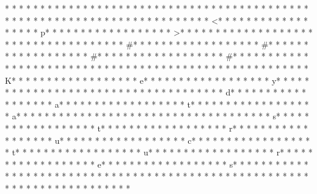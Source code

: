 * * *  * * *  * * *  *  * * *  *  * * *  * 	* * *  * * *  * * *  *  * * *  *  * * *  * 
* * *  * * *  * * *  *  * * *  *  * * *  * 	* * *  * * *  * * *  *  * * *  *  * * *  * <* * *  * * *  * * *  *  * * *  *  * * *  * p* * *  * * *  * * *  *  * * *  *  * * *  * >* * *  * * *  * * *  *  * * *  *  * * *  * 
* * *  * * *  * * *  *  * * *  *  * * *  * #* * *  * * *  * * *  *  * * *  *  * * *  * #* * *  * * *  * * *  *  * * *  *  * * *  * #* * *  * * *  * * *  *  * * *  *  * * *  * #* * *  * * *  * * *  *  * * *  *  * * *  *  * * *  * * *  * * *  *  * * *  *  * * *  * {* * *  * * *  * * *  *  * * *  *  * * *  * K* * *  * * *  * * *  *  * * *  *  * * *  * e* * *  * * *  * * *  *  * * *  *  * * *  * y* * *  * * *  * * *  *  * * *  *  * * *  *  * * *  * * *  * * *  *  * * *  *  * * *  * d* * *  * * *  * * *  *  * * *  *  * * *  * a* * *  * * *  * * *  *  * * *  *  * * *  * t* * *  * * *  * * *  *  * * *  *  * * *  * a* * *  * * *  * * *  *  * * *  *  * * *  *  * * *  * * *  * * *  *  * * *  *  * * *  * s* * *  * * *  * * *  *  * * *  *  * * *  * t* * *  * * *  * * *  *  * * *  *  * * *  * r* * *  * * *  * * *  *  * * *  *  * * *  * u* * *  * * *  * * *  *  * * *  *  * * *  * c* * *  * * *  * * *  *  * * *  *  * * *  * t* * *  * * *  * * *  *  * * *  *  * * *  * u* * *  * * *  * * *  *  * * *  *  * * *  * r* * *  * * *  * * *  *  * * *  *  * * *  * e* * *  * * *  * * *  *  * * *  *  * * *  * s* * *  * * *  * * *  *  * * *  *  * * *  * }* * *  * * *  * * *  *  * * *  *  * * *  * 
* * *  * * *  * * *  *  * * *  *  * * *  * 	* * *  * * *  * * *  *  * * *  *  * * *  * 
